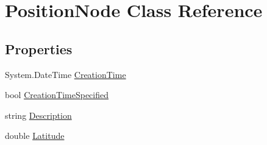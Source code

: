 \hypertarget{class_position_node}{
\section{PositionNode Class Reference}
\label{class_position_node}
}


 
\subsection*{Properties}
\begin{DoxyCompactItemize}
\item 
\hypertarget{class_position_node_a25e70b5ac7e1562bee46c550b655aca3}{
System.DateTime \hyperlink{class_position_node_a25e70b5ac7e1562bee46c550b655aca3}{CreationTime}}
\label{class_position_node_a25e70b5ac7e1562bee46c550b655aca3}

\begin{DoxyCompactList}\small\item\em \item\end{DoxyCompactList}\item 
\hypertarget{class_position_node_ae113cf45f336ffdca466b3b348542b6d}{
bool \hyperlink{class_position_node_ae113cf45f336ffdca466b3b348542b6d}{CreationTimeSpecified}}
\label{class_position_node_ae113cf45f336ffdca466b3b348542b6d}

\begin{DoxyCompactList}\small\item\em \item\end{DoxyCompactList}\item 
\hypertarget{class_position_node_a2de15e5b9d17882dc0c57a73a3e19a03}{
string \hyperlink{class_position_node_a2de15e5b9d17882dc0c57a73a3e19a03}{Description}}
\label{class_position_node_a2de15e5b9d17882dc0c57a73a3e19a03}

\begin{DoxyCompactList}\small\item\em \item\end{DoxyCompactList}\item 
\hypertarget{class_position_node_a9ba611f655423cc8bc154842217cf51f}{
double \hyperlink{class_position_node_a9ba611f655423cc8bc154842217cf51f}{Latitude}}
\label{class_position_node_a9ba611f655423cc8bc154842217cf51f}


\end{DoxyCompactItemize}
